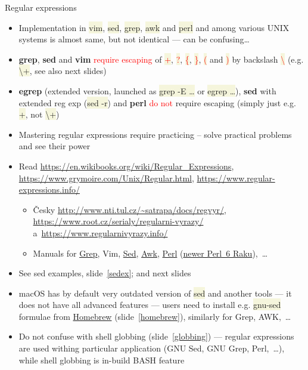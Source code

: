 \documentclass[compress, ucs, xelatex, 11pt, xcolor=svgnames, aspectratio=169,
	hyperref={
		bookmarks=true,
		unicode=true,
		colorlinks=true,
		pdftitle={Linux, command line and MetaCentrum},
		plainpages=false,
		pdfauthor={Vojtech Zeisek},
		pdfsubject={Course about use of Linux command line, writing shell scripts and using MetaCentrum of CESNET},
		pdfcreator={XeLaTeX},
		pdfkeywords={Linux, GNU, BASH, shell, command line, MetaCentrum},
		linkcolor=DarkRed, %
		anchorcolor=DarkBlue, %
		citecolor=Indigo, %
		filecolor=NavyBlue, %
		menucolor=DarkMagenta, %
		urlcolor=DarkBlue, %
		pdftex},
	url={hyphens, lowtilde} %
	]{beamer}
\renewcommand{\texttt}[1]{\colorbox{Beige}{{\ttfamily #1}}}
\renewcommand{\alert}[1]{\textcolor{red}{#1}}
\begin{document}
\begin{frame}[allowframebreaks]{Regular expressions}
	\label{regexp}
	\begin{itemize}
		\item Implementation in \texttt{vim}, \texttt{sed}, \texttt{grep}, \texttt{awk} and \texttt{perl} and among various UNIX systems is almost same, but not identical --- can be confusing\ldots
		\item \textbf{grep}, \textbf{sed} and \textbf{vim} \alert{require escaping} of \alert{\texttt{+}}, \alert{\texttt{?}}, \alert{\texttt{\{}}, \alert{\texttt{\}}}, \alert{\texttt{(}} and \alert{\texttt{)}} by backslash \alert{\texttt{\textbackslash}} (e.g. \texttt{\textbackslash +}, see also next slides)
		\item \textbf{egrep} (extended version, launched as \texttt{grep -E \ldots} or \texttt{egrep \ldots}), \textbf{sed} with extended reg exp (\texttt{sed -r}) and \textbf{perl} \alert{do not} require escaping (simply just e.g. \texttt{+}, not \texttt{\textbackslash +})
		\item Mastering regular expressions require practicing -- solve practical problems and see their power
		\item Read \url{https://en.wikibooks.org/wiki/Regular_Expressions}, \url{https://www.grymoire.com/Unix/Regular.html}, \url{https://www.regular-expressions.info/}
		\begin{itemize}
			\item Česky \url{http://www.nti.tul.cz/~satrapa/docs/regvyr/}, \url{https://www.root.cz/serialy/regularni-vyrazy/} a~\url{https://www.regularnivyrazy.info/}
			\item Manuals for \href{https://www.gnu.org/software/grep/manual/}{Grep}, Vim, \href{https://www.gnu.org/software/sed/manual/}{Sed}, \href{https://www.gnu.org/software/gawk/manual/}{Awk}, \href{https://en.wikibooks.org/wiki/Perl_Programming}{Perl} (\href{https://en.wikibooks.org/wiki/Raku_Programming}{newer Perl~6 Raku}),~\ldots
		\end{itemize}
		\item See sed examples, slide~\ref{sedex}; and next slides
		\item macOS has by default very outdated version of \texttt{sed} and another tools --- it does not have all advanced features --- users need to install e.g. \texttt{gnu-sed} formulae from \href{https://brew.sh/}{Homebrew} (slide~\ref{homebrew}), similarly for Grep, AWK,~\ldots
		\item Do not confuse with shell globbing (slide~\ref{globbing}) --- regular expressions are used withing particular application (GNU Sed, GNU Grep, Perl,~\ldots), while shell globbing is in-build BASH feature

\end{itemize}
\end{frame}
\end{document}
